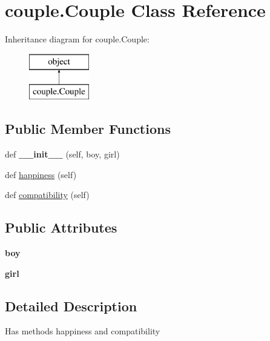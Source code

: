 \hypertarget{classcouple_1_1_couple}{}\section{couple.\+Couple Class Reference}
\label{classcouple_1_1_couple}
Inheritance diagram for couple.\+Couple\+:\begin{figure}[H]
\begin{center}
\leavevmode
\includegraphics[height=2.000000cm]{classcouple_1_1_couple}
\end{center}
\end{figure}
\subsection*{Public Member Functions}
\begin{DoxyCompactItemize}
\item 
\mbox{\label{classcouple_1_1_couple_a3cd6b67c48b545c1b51a8c11ac70677c}} 
def {\bfseries \+\_\+\+\_\+init\+\_\+\+\_\+} (self, boy, girl)
\item 
def \hyperlink{classcouple_1_1_couple_ab7ac98ab6a0dd03bf75790f949cb0c90}{happiness} (self)
\item 
def \hyperlink{classcouple_1_1_couple_a1752d35bbc3da6524676374511693988}{compatibility} (self)
\end{DoxyCompactItemize}
\subsection*{Public Attributes}
\begin{DoxyCompactItemize}
\item 
\mbox{\label{classcouple_1_1_couple_a9add8e4c50bcbf4424339df43ed77df6}} 
{\bfseries boy}
\item 
\mbox{\label{classcouple_1_1_couple_a99b4aa0aa5cd56aab0edebbba13e31b3}} 
{\bfseries girl}
\end{DoxyCompactItemize}


\subsection{Detailed Description}
\begin{DoxyVerb}Has methods  happiness and compatibility
\end{DoxyVerb}
 

